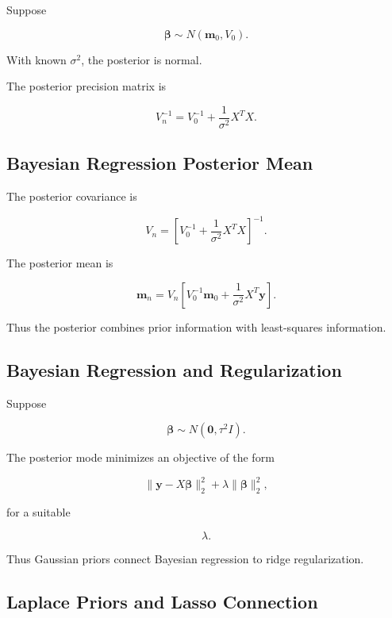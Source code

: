 Suppose

\[
\boxed{
\boldsymbol{\beta}
\sim
N
(
\mathbf{m}_0,
V_0
).
}
\]

With known \(\sigma^2\), the posterior is normal.

The posterior precision matrix is

\[
\boxed{
V_n^{-1}
=
V_0^{-1}
+
\frac1{\sigma^2}
X^TX.
}
\]

\subsection{Bayesian Regression Posterior Mean}
\label{subsec:bayesian-regression-posterior-mean}

The posterior covariance is

\[
\boxed{
V_n
=
\left[
V_0^{-1}
+
\frac1{\sigma^2}
X^TX
\right]^{-1}.
}
\]

The posterior mean is

\[
\boxed{
\mathbf{m}_n
=
V_n
\left[
V_0^{-1}\mathbf{m}_0
+
\frac1{\sigma^2}
X^T\mathbf{y}
\right].
}
\]

Thus the posterior combines prior information with least-squares
information.

\subsection{Bayesian Regression and Regularization}
\label{subsec:bayesian-regularization}

Suppose

\[
\boldsymbol{\beta}
\sim
N
(
\mathbf{0},
\tau^2I
).
\]

The posterior mode minimizes an objective of the form

\[
\boxed{
\|\mathbf{y}-X\boldsymbol{\beta}\|_2^2
+
\lambda
\|\boldsymbol{\beta}\|_2^2,
}
\]

for a suitable

\[
\lambda.
\]

Thus Gaussian priors connect Bayesian regression to ridge
regularization.

\subsection{Laplace Priors and Lasso Connection}
\label{subsec:laplace-prior-lasso}

